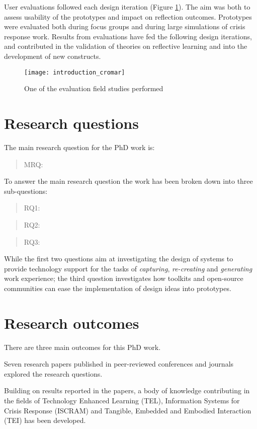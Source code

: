 User evaluations followed each design iteration (Figure \ref{fig:cromar}). The aim was both to assess usability of the prototypes and impact on reflection outcomes. Prototypes were evaluated both during focus groups and during large simulations of crisis response work. Results from evaluations have fed the following design iterations, and contributed in the validation of theories on reflective learning and into the development of new constructs.
\begin{figure}
	[tbh] \centering 
	\texttt{[image: introduction\_cromar]} 
	\caption{One of the evaluation field studies performed} 
	\label{fig:cromar} 
\end{figure}

\section{Research questions}\label{research-questions}

The main research question for the PhD work is:
\begin{quote}
	MRQ: \MRQ 
\end{quote}

To answer the main research question the work has been broken down into three sub-questions:
\begin{quote}
	RQ1: \RQi 
\end{quote}
\begin{quote}
	RQ2: \RQii 
\end{quote}
\begin{quote}
	RQ3: \RQiii 
\end{quote}

While the first two questions aim at investigating the design of systems to provide technology support for the tasks of \emph{capturing}, \emph{re-creating} and \emph{generating} work experience; the third question investigates how toolkits and open-source communities can ease the implementation of design ideas into prototypes.

\section{Research outcomes}\label{research-outcomes}

There are three main outcomes for this PhD work.

Seven research papers published in peer-reviewed conferences and journals explored the research questions.

Building on results reported in the papers, a body of knowledge contributing in the fields of Technology Enhanced Learning (TEL), Information Systems for Crisis Response (ISCRAM) and Tangible, Embedded and Embodied Interaction (TEI) has been developed.


